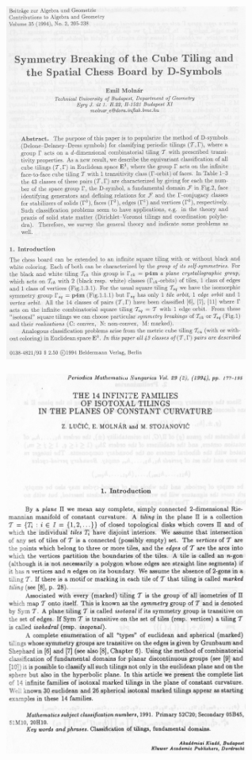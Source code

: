 \begin{frame}
  \center\includegraphics[width=0.6\textwidth]{illustration1.png}
\end{frame}

\begin{frame}
  \center\includegraphics[width=0.6\textwidth]{illustration2.png}
\end{frame}

